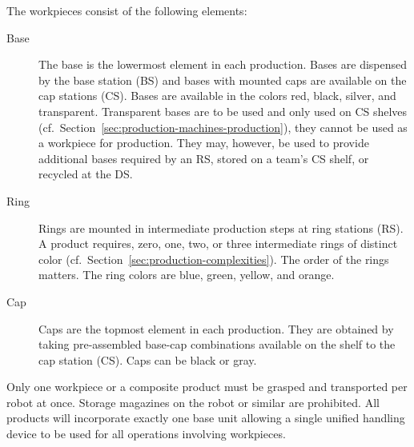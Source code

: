 \documentclass[12pt,twoside]{article}
\newcommand{\refsec}[1]{Section~\ref{#1}}
\begin{document}
\noindent
The workpieces consist of the following elements:
\begin{description}
\item[Base] The base is the lowermost element in each production.
  Bases are dispensed by the base station (BS) and bases with mounted
  caps are available on the cap stations (CS). Bases are available in
  the colors red, black, silver, and transparent. Transparent bases
  are to be used and only used on CS shelves
  (cf.~\refsec{sec:production-machines-production}), they cannot be
  used as a workpiece for production. They may, however, be used to
  provide additional bases required by an RS, stored on a team's CS
  shelf, or recycled at the DS.
\item[Ring] Rings are mounted in intermediate production steps at ring
  stations (RS). A product requires, zero, one, two, or three
  intermediate rings of distinct color
  (cf.~\refsec{sec:production-complexities}). The order of the rings
  matters. The ring colors are blue, green, yellow, and orange.
\item[Cap] Caps are the topmost element in each production. They are
  obtained by taking pre-assembled base-cap combinations available on
  the shelf to the cap station (CS). Caps can be black or gray.

\end{description}
Only one workpiece or a composite product must be grasped and
transported per robot at once. Storage magazines on the robot or
similar are prohibited. All products will incorporate exactly one base
unit allowing a single unified handling device to be used for all
operations involving workpieces.
\end{document}
